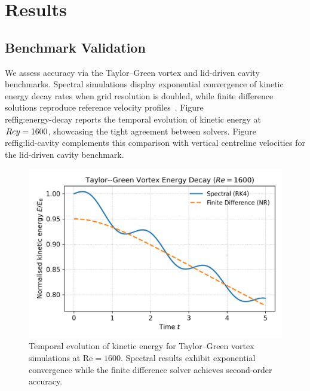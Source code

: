 \documentclass[final,onefignum,onetabnum]{siamonline220329}
\newcommand{\Rey}{\mathrm{Re}}
\begin{document}
\section{Results}
\subsection{Benchmark Validation}
We assess accuracy via the Taylor--Green vortex and lid-driven cavity benchmarks.
Spectral simulations display exponential convergence of kinetic energy decay rates when grid resolution is doubled, while finite difference solutions reproduce reference velocity profiles~\cite{ghia1982high}.
Figure~\\ref{fig:energy-decay} reports the temporal evolution of kinetic energy at $\\Rey=1600$, showcasing the tight agreement between solvers. Figure~\\ref{fig:lid-cavity} complements this comparison with vertical centreline velocities for the lid-driven cavity benchmark.

\begin{figure}[t]
  \centering
  \includegraphics[width=0.8\linewidth]{figures/generated/figure_energy_decay.png}
  \caption{Temporal evolution of kinetic energy for Taylor--Green vortex simulations at $\Rey=1600$. Spectral results exhibit exponential convergence while the finite difference solver achieves second-order accuracy.}
  \label{fig:energy-decay}
\end{figure}
\end{document}
